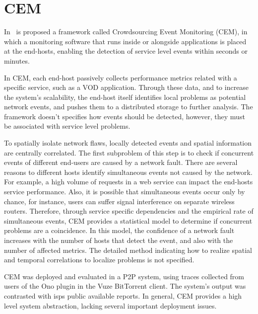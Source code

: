 \section{CEM}

In~\cite{crowdsourcing_service_level_network_event_monitoring} is proposed a
framework called Crowdsourcing Event Monitoring (CEM), in which a
monitoring software that runs inside or alongside applications is placed at the
end-hosts, enabling the detection of service level events within seconds or
minutes.

In CEM, each end-host passively collects performance metrics related with a
specific service, such as a VOD application.
Through these data, and to increase the system's scalability,
the end-host itself identifies local problems as
potential network events, and pushes them to a distributed storage to further
analysis.
The framework doesn't specifies how events should be detected,
however, they must be associated with service level problems.

To spatially isolate network flaws, locally detected events and spatial
information are centrally correlated.
The first subproblem of this step is to check if concurrent events
of different end-users are caused by a
network fault. There are several reasons to different hosts identify
simultaneous events not caused by the network.
For example, a high volume of requests in a web service can impact the end-hosts
service performance. Also, it is
possible that simultaneous events occur only by chance, for instance, users
can suffer signal interference on separate wireless routers.
Therefore, through service specific dependencies and the empirical rate of
simultaneous
events, CEM provides a statistical model to determine if
concurrent problems are a coincidence.
In this model, the confidence of a network fault increases with the
number of hosts that detect the event, and also with the number of affected
metrics.
The detailed method indicating how to realize spatial and temporal
correlations to
localize problems is not specified.

CEM was deployed and evaluated in a P2P system, using traces
collected
from users of the Ono plugin in the Vuze BitTorrent client. The system's
output was contrasted with \glspl*{isp} public available reports. In general,
CEM provides a high level system abstraction, lacking several
important deployment issues.
